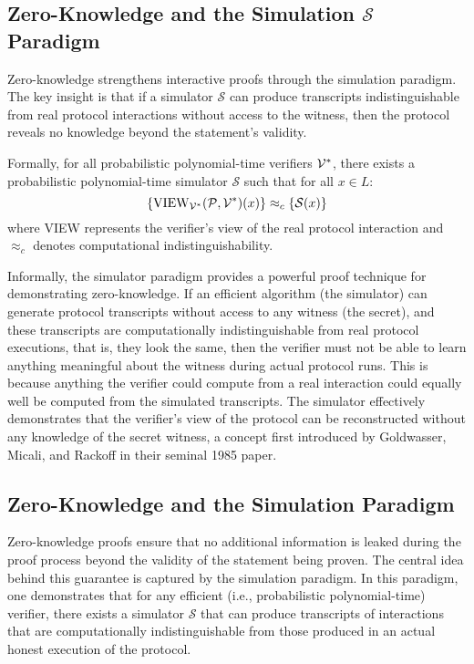 \subsection{Zero-Knowledge and the Simulation $\mathcal{S}$ Paradigm}
Zero-knowledge strengthens interactive proofs through the simulation paradigm. The key insight is that if a simulator $\mathcal{S}$ can produce transcripts indistinguishable from real protocol interactions without access to the witness, then the protocol reveals no knowledge beyond the statement's validity. 

Formally, for all probabilistic polynomial-time verifiers $\mathcal{V}^*$, there exists a probabilistic polynomial-time simulator $\mathcal{S}$ such that for all $x \in L$:
\[ 
\{\text{VIEW}_{\mathcal{V}^*}(\mathcal{P},\mathcal{V}^*)(x)\} \approx_c \{\mathcal{S}(x)\} 
\]
\noindent where VIEW represents the verifier's view of the real protocol interaction and $\approx_c$ denotes computational indistinguishability.

\noindent Informally, the simulator paradigm provides a powerful proof technique for demonstrating zero-knowledge. If an efficient algorithm (the simulator) can generate protocol transcripts without access to any witness (the secret), and these transcripts are computationally indistinguishable from real protocol executions, that is, they look the same, then the verifier must not be able to learn anything meaningful about the witness during actual protocol runs. This is because anything the verifier could compute from a real interaction could equally well be computed from the simulated transcripts. The simulator effectively demonstrates that the verifier's view of the protocol can be reconstructed without any knowledge of the secret witness, a concept first introduced by Goldwasser, Micali, and Rackoff in their seminal 1985 paper.



\subsection{Zero-Knowledge and the Simulation Paradigm}

Zero-knowledge proofs ensure that no additional information is leaked during the proof process beyond the validity of the statement being proven. The central idea behind this guarantee is captured by the simulation paradigm. In this paradigm, one demonstrates that for any efficient (i.e., probabilistic polynomial-time) verifier, there exists a simulator $\mathcal{S}$ that can produce transcripts of interactions that are computationally indistinguishable from those produced in an actual honest execution of the protocol.

